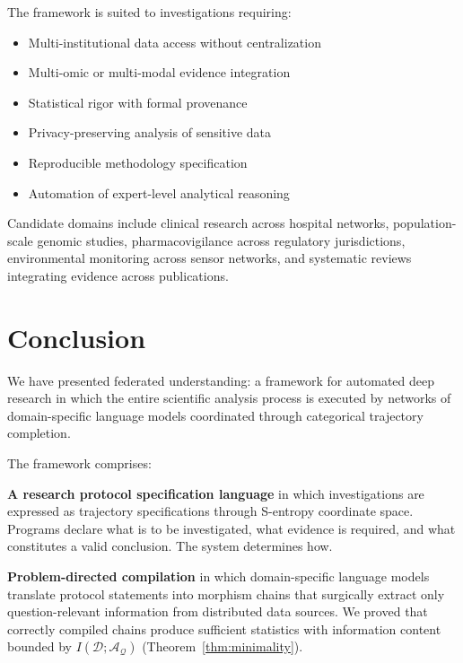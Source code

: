 \documentclass[10pt,twocolumn]{article}
\theoremstyle{definition}
\theoremstyle{remark}
\newcommand{\question}{\mathcal{Q}}
\newcommand{\answer}{\mathcal{A}}
\newcommand{\dataset}{\mathcal{D}}
\begin{document}
The framework is suited to investigations requiring:

\begin{itemize}[nosep]
\item Multi-institutional data access without centralization
\item Multi-omic or multi-modal evidence integration \cite{hasin2017,reel2021}
\item Statistical rigor with formal provenance
\item Privacy-preserving analysis of sensitive data
\item Reproducible methodology specification
\item Automation of expert-level analytical reasoning
\end{itemize}

Candidate domains include clinical research across hospital networks, population-scale genomic studies, pharmacovigilance across regulatory jurisdictions, environmental monitoring across sensor networks, and systematic reviews integrating evidence across publications.

\section{Conclusion}
\label{sec:conclusion}

We have presented federated understanding: a framework for automated deep research in which the entire scientific analysis process is executed by networks of domain-specific language models coordinated through categorical trajectory completion.

The framework comprises:

\textbf{A research protocol specification language} in which investigations are expressed as trajectory specifications through S-entropy coordinate space. Programs declare what is to be investigated, what evidence is required, and what constitutes a valid conclusion. The system determines how.

\textbf{Problem-directed compilation} in which domain-specific language models translate protocol statements into morphism chains that surgically extract only question-relevant information from distributed data sources. We proved that correctly compiled chains produce sufficient statistics with information content bounded by $I(\dataset; \answer_\question)$ (Theorem~\ref{thm:minimality}).
\end{document}
